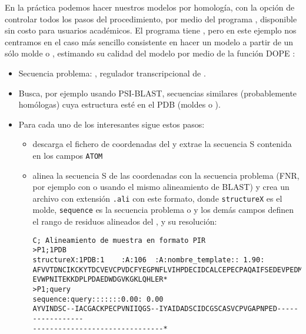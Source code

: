 En la pr\'{a}ctica podemos hacer nuestros modelos por homolog\'{i}a, con la opci\'{o}n de controlar todos los pasos
del procedimiento, por medio del programa  \citep{Sali1993}, 
disponible sin costo para usuarios acad\'{e}micos. %
El programa tiene , pero en este ejemplo
nos centramos en el caso m\'{a}s sencillo consistente en hacer un modelo a partir de un s\'{o}lo molde o ,
estimando su calidad del modelo por medio de la funci\'{o}n DOPE \citep{Shen2006}:
\begin{itemize}

\item Secuencia problema: , 
regulador transcripcional de .

\item Busca, por ejemplo usando PSI-BLAST, secuencias similares (probablemente hom\'{o}logas)
cuya estructura est\'{e} en el PDB (moldes o ).

\item Para cada uno de los  interesantes sigue estos pasos:
\begin{itemize}

	\item descarga el fichero de coordenadas del  
	y extrae la secuencia S contenida en los campos \verb+ATOM+

	\item alinea la secuencia S de las coordenadas con la secuencia problema (FNR, por ejemplo con 
   o usando el mismo alineamiento de BLAST) 
	y crea un archivo con extensi\'{o}n 
	\verb+.ali+ con este formato, donde \verb+structureX+ es el molde, \verb+sequence+ es la secuencia problema o  
	y los dem\'{a}s campos definen el rango de residuos alineados del , y su resoluci\'{o}n:

\begin{verbatim}
C; Alineamiento de muestra en formato PIR
>P1;1PDB
structureX:1PDB:1    :A:106  :A:nombre_template:: 1.90: 
AFVVTDNCIKCKYTDCVEVCPVDCFYEGPNFLVIHPDECIDCALCEPECPAQAIFSEDEVPEDMQEFIQLNAELA
EVWPNITEKKDPLPDAEDWDGVKGKLQHLER*
>P1;query
sequence:query:::::::0.00: 0.00
AYVINDSC--IACGACKPECPVNIIQGS--IYAIDADSCIDCGSCASVCPVGAPNPED-----------------
-------------------------------*
\end{verbatim}


\end{itemize}
\end{itemize}
